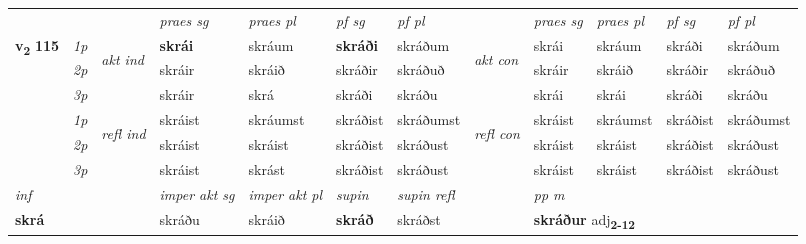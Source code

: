 \begin{longtable}[l]{X>{\footnotesize\itshape}llXXXXlXXXX}
 & &   & \textit{praes sg}  & \textit{praes pl}    & \textit{ pf sg} & \textit{pf pl} & & \textit{praes sg}  & \textit{praes pl}    & \textit{pf sg} & \textit{pf pl }  \\ \cmidrule{4-7} \cmidrule{9-12}
 \multirow{2}{*}{{{\textbf{v{\textsubscript{2}}} \Large{\textbf{115}}}}}  & 1p & \multirow{3}{*}{\begin{turn}{90}\textit{akt ind}\end{turn}} & \textbf{skrái} & skráum & \textbf{skráði} & skráðum & \multirow{3}{*}{\begin{turn}{90}\textit{akt con}\end{turn}} &skrái & skráum & skráði & skráðum\\*
 & 2p &  &  skráir  & skráið & skráðir & skráðuð & & skráir & skráið & skráðir & skráðuð \\*
 & 3p &  & skráir & skrá & skráði & skráðu & & skrái & skrái& skráði & skráðu \\*
\cmidrule{4-7} \cmidrule{9-12}
 & 1p & \multirow{3}{*}{\begin{turn}{90}\textit{refl ind}\end{turn}}  & skráist & skráumst & skráðist & skráðumst & \multirow{3}{*}{\begin{turn}{90}\textit{refl con}\end{turn}}  &skráist & skráumst & skráðist & skráðumst \\*
 & 2p &  & skráist & skráist & skráðist & skráðust & &skráist & skráist & skráðist & skráðust \\*
 & 3p  & & skráist & skrást & skráðist & skráðust & & skráist & skráist& skráðist & skráðust \\*
\cmidrule{4-7} \cmidrule{9-12}

   {\textit{inf}} & &  & \textit{imper akt sg} & \textit{imper akt pl}    & \textit{supin} & \textit{supin refl} && \textit{pp m} \\*
  {\textbf{skrá}} & && skráðu  & skráið    &  \textbf{skráð} & skráðst && \multicolumn{2}{l}{\textbf{skráður} adj\textbf{\textsubscript{2-12}}} \\*

\midrule


\end{longtable}
